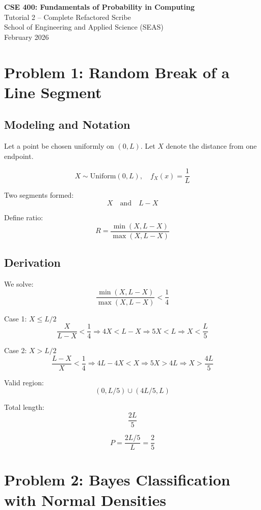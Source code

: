 \documentclass[11pt]{article}
\begin{document}
\begin{center}
    \Large \textbf{CSE 400: Fundamentals of Probability in Computing}\\
    \large Tutorial 2 -- Complete Refactored Scribe\\
    \normalsize School of Engineering and Applied Science (SEAS)\\
    February 2026
\end{center}

\vspace{0.5cm}

\section{Problem 1: Random Break of a Line Segment}

\subsection*{Modeling and Notation}

Let a point be chosen uniformly on $(0,L)$.  
Let $X$ denote the distance from one endpoint.

\[
X \sim \text{Uniform}(0,L), \quad f_X(x)=\frac{1}{L}
\]

Two segments formed:
\[
X \quad \text{and} \quad L-X
\]

Define ratio:
\[
R = \frac{\min(X,L-X)}{\max(X,L-X)}
\]

\subsection*{Derivation}

We solve:
\[
\frac{\min(X,L-X)}{\max(X,L-X)} < \frac14
\]

Case 1: $X \le L/2$
\[
\frac{X}{L-X} < \frac14
\Rightarrow 4X < L-X
\Rightarrow 5X < L
\Rightarrow X < \frac{L}{5}
\]

Case 2: $X > L/2$
\[
\frac{L-X}{X} < \frac14
\Rightarrow 4L - 4X < X
\Rightarrow 5X > 4L
\Rightarrow X > \frac{4L}{5}
\]

Valid region:
\[
(0, L/5) \cup (4L/5, L)
\]

Total length:
\[
\frac{2L}{5}
\]

\[
P = \frac{2L/5}{L} = \boxed{\frac{2}{5}}
\]

\section{Problem 2: Bayes Classification with Normal Densities}
\end{document}
